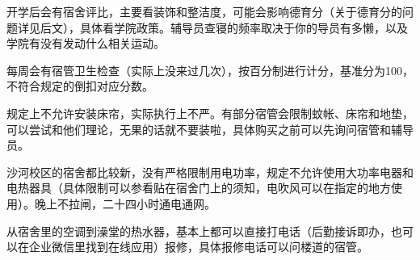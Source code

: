 
开学后会有宿舍评比，主要看装饰和整洁度，可能会影响德育分（关于德育分的问题详见后文），具体看学院政策。辅导员查寝的频率取决于你的导员有多懒，以及学院有没有发动什么相关运动。

每周会有宿管卫生检查（实际上没来过几次），按百分制进行计分，基准分为100，不符合规定的倒扣对应分数。


规定上不允许安装床帘，实际执行上不严。有部分宿管会限制蚊帐、床帘和地垫，可以尝试和他们理论，无果的话就不要装啦，具体购买之前可以先询问宿管和辅导员。


沙河校区的宿舍都比较新，没有严格限制用电功率，规定不允许使用大功率电器和电热器具（具体限制可以参看贴在宿舍门上的须知，电吹风可以在指定的地方使用）。晚上不拉闸，二十四小时通电通网。


从宿舍里的空调到澡堂的热水器，基本上都可以直接打电话（后勤接诉即办，也可以在企业微信里找到在线应用）报修，具体报修电话可以问楼道的宿管。
